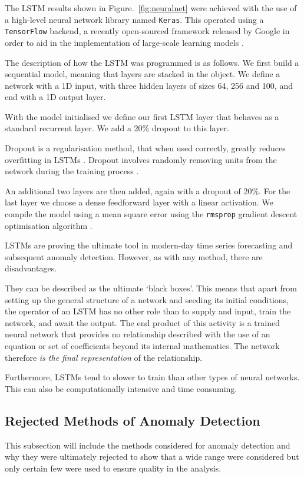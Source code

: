 The LSTM results shown in Figure.~\ref{fig:neuralnet} were achieved with the use of a high-level neural network library named \texttt{Keras}. This operated using a \texttt{TensorFlow} backend, a recently open-sourced framework released by Google in order to aid in the implementation of large-scale learning models \cite{Abadi:2016:TSL:3026877.3026899}.

The description of how the LSTM was programmed is as follows. We first build a sequential model, meaning that layers are stacked in the object.  We define a network with a 1D input, with three hidden layers of sizes 64, 256 and 100, and end with a 1D output layer.

With the model initialised we define our first LSTM layer that behaves as a standard recurrent layer. We add a 20\% dropout to this layer. 

Dropout is a regularisation method, that when used correctly, greatly reduces overfitting in LSTMs \cite{2014arXiv1409.2329Z}. Dropout involves randomly removing units from the network during the training process \cite{2013arXiv1311.0701B}.

An additional two layers are then added, again with a dropout of 20\%. For the last layer we choose a dense feedforward layer with a linear activation. We compile the model using a mean square error using the \texttt{rmsprop} gradient descent optimisation algorithm \cite{tieleman2012lecture}.

LSTMs are proving the ultimate tool in modern-day time series forecasting and subsequent anomaly detection. However, as with any method, there are disadvantages.

They can be described as the ultimate `black boxes'. This means that apart from setting up the general structure of a network and seeding its initial conditions, the operator of an LSTM has no other role than to supply and input, train the network, and await the output. The end product of this activity is a trained neural network that provides no relationship described with the use of an equation or set of coefficients beyond its internal mathematics. The network therefore \emph{is the final representation} of the relationship.

Furthermore, LSTMs tend to slower to train than other types of neural networks. This can also be computationally intensive and time consuming.


\subsection{Rejected Methods of Anomaly Detection}
This subsection will include the methods considered for anomaly detection and why they were ultimately rejected to show that a wide range were considered but only certain few were used to ensure quality in the analysis.
